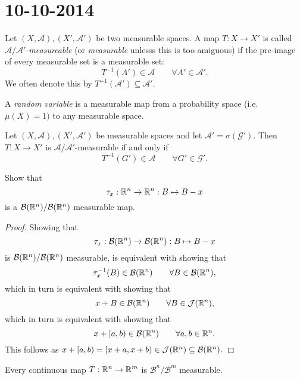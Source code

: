 \section{10-10-2014}
\begin{defn}
Let \((X,\mathcal{A}),(X',\mathcal{A}')\) be two measurable spaces. A map \(T:X\rightarrow X'\) is called \emph{\(\mathcal{A}/\mathcal{A}'\)-measureable} (or \emph{measurable} unlesss this is too amiguous) if the pre-image of every measurable set is a measurable set:
\[
T^{-1}(A')\in \mathcal{A} \qquad \forall A'\in \mathcal{A}'.
\]
We often denote this by \(T^{-1}(\mathcal{A}')\subseteq \mathcal{A}'\).
\end{defn}

\begin{defn}
A \emph{random variable} is a measurable map from a probability space (i.e. \(\mu (X)=1)\) to any measurable space.
\end{defn}

\begin{thm}[Lemma 7.2]
Let \((X,\mathcal{A}),(X',\mathcal{A}')\) be measurable spaces and let \(\mathcal{A}'= \sigma (\mathcal{G}').\) Then \(T:X\rightarrow X'\) is \(\mathcal{A}/\mathcal{A}'\)-measurable if and only if
\[
T^{-1}(G')\in \mathcal{A} \qquad \forall G'\in \mathcal{G}'.
\]
\end{thm}

\begin{thm}[Problem 7.1]
Show that
\[
\tau _{x}:\Bbb{R}^n \rightarrow \Bbb{R}^n : B\mapsto B-x 
\]
is a \(\mathcal{B}(\Bbb{R}^n)/\mathcal{B}(\Bbb{R}^n)\) measurable map.
\end{thm}

\begin{proof}
Showing that
\[
\tau _{x}:\mathcal{B}(\Bbb{R}^n) \rightarrow \mathcal{B}(\Bbb{R}^n) : B\mapsto B-x
\]
is \(\mathcal{B}(\Bbb{R}^n)/\mathcal{B}(\Bbb{R}^n)\) measurable, is equivalent with showing that
\[
\tau _{x}^{-1}(B)\in \mathcal{B}(\Bbb{R}^n) \qquad \forall B\in \mathcal{B}(\Bbb{R}^n),
\]
which in turn is equivalent with showing that
\[
x+B\in \mathcal{B}(\Bbb{R}^n) \qquad \forall B\in \mathcal{J}(\Bbb{R}^n),
\]
which in turn is equivalent with showing that
\[
x+[a,b)\in \mathcal{B}(\Bbb{R}^n) \qquad \forall a,b\in \Bbb{R}^n.
\]
This follows as \(x+[a,b)=[x+a,x+b)\in \mathcal{J}(\Bbb{R}^n)\subseteq \mathcal{B}(\Bbb{R}^n).\)
\end{proof}

\begin{thm}
Every continuous map \(T:\Bbb{R}^n\rightarrow \Bbb{R}^m\) is \(\mathcal{B}^n/\mathcal{B}^m\) measurable.
\end{thm}

